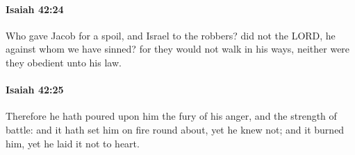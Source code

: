 		\paragraph{Isaiah 42:24} %
			\label{ISAIAH-42-24}

			Who gave Jacob for a spoil, and Israel to the robbers? did not the LORD, he against whom we have sinned? for they would not walk in his ways, neither were they obedient unto his law.


		\paragraph{Isaiah 42:25} %
			\label{ISAIAH-42-25}

			Therefore he hath poured upon him the fury of his anger, and the strength of battle: and it hath set him on fire round about, yet he knew not; and it burned him, yet he laid it not to heart.

